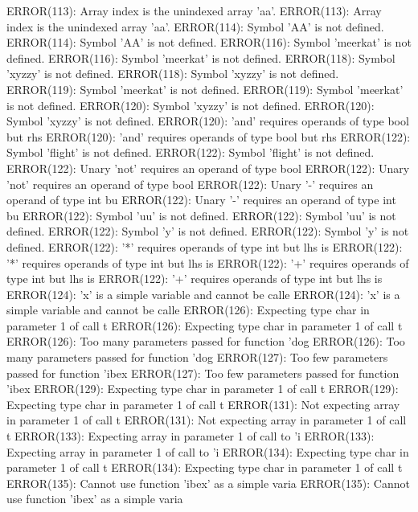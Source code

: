 \documentclass[12pt]{book}
\begin{document}
ERROR(113): Array index is the unindexed array 'aa'.                ERROR(113): Array index is the unindexed array 'aa'.
ERROR(114): Symbol 'AA' is not defined.                                ERROR(114): Symbol 'AA' is not defined.
ERROR(116): Symbol 'meerkat' is not defined.                        ERROR(116): Symbol 'meerkat' is not defined.
ERROR(118): Symbol 'xyzzy' is not defined.                        ERROR(118): Symbol 'xyzzy' is not defined.
ERROR(119): Symbol 'meerkat' is not defined.                        ERROR(119): Symbol 'meerkat' is not defined.
ERROR(120): Symbol 'xyzzy' is not defined.                        ERROR(120): Symbol 'xyzzy' is not defined.
ERROR(120): 'and' requires operands of type bool but rhs        ERROR(120): 'and' requires operands of type bool but rhs
ERROR(122): Symbol 'flight' is not defined.                        ERROR(122): Symbol 'flight' is not defined.
ERROR(122): Unary 'not' requires an operand of type bool        ERROR(122): Unary 'not' requires an operand of type bool
ERROR(122): Unary '-' requires an operand of type int bu        ERROR(122): Unary '-' requires an operand of type int bu
ERROR(122): Symbol 'uu' is not defined.                                ERROR(122): Symbol 'uu' is not defined.
ERROR(122): Symbol 'y' is not defined.                                ERROR(122): Symbol 'y' is not defined.
ERROR(122): '*' requires operands of type int but lhs is        ERROR(122): '*' requires operands of type int but lhs is
ERROR(122): '+' requires operands of type int but lhs is        ERROR(122): '+' requires operands of type int but lhs is
ERROR(124): 'x' is a simple variable and cannot be calle        ERROR(124): 'x' is a simple variable and cannot be calle
ERROR(126): Expecting type char in parameter 1 of call t        ERROR(126): Expecting type char in parameter 1 of call t
ERROR(126): Too many parameters passed for function 'dog        ERROR(126): Too many parameters passed for function 'dog
ERROR(127): Too few parameters passed for function 'ibex        ERROR(127): Too few parameters passed for function 'ibex
ERROR(129): Expecting type char in parameter 1 of call t        ERROR(129): Expecting type char in parameter 1 of call t
ERROR(131): Not expecting array in parameter 1 of call t        ERROR(131): Not expecting array in parameter 1 of call t
ERROR(133): Expecting array in parameter 1 of call to 'i        ERROR(133): Expecting array in parameter 1 of call to 'i
ERROR(134): Expecting type char in parameter 1 of call t        ERROR(134): Expecting type char in parameter 1 of call t
ERROR(135): Cannot use function 'ibex' as a simple varia        ERROR(135): Cannot use function 'ibex' as a simple varia
\end{document}
